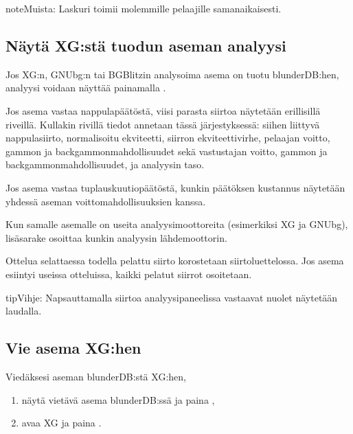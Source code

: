 \documentclass[letterpaper,10pt,finnish]{sphinxmanual}
\begin{document}
\begin{sphinxadmonition}{note}{Muista:}
\sphinxAtStartPar
Laskuri toimii molemmille pelaajille samanaikaisesti.
\end{sphinxadmonition}


\subsection{Näytä XG:stä tuodun aseman analyysi}
\label{\detokenize{guide_utilisateur:afficher-l-analyse-d-une-position-importee-depuis-xg}}
\sphinxAtStartPar
Jos XG:n, GNUbg:n tai BGBlitzin analysoima asema on tuotu blunderDB:hen, analyysi voidaan näyttää painamalla .

\sphinxAtStartPar
Jos asema vastaa nappulapäätöstä, viisi parasta siirtoa näytetään erillisillä riveillä. Kullakin rivillä tiedot annetaan tässä järjestyksessä: siihen liittyvä nappulasiirto, normalisoitu ekviteetti, siirron ekviteettivirhe, pelaajan voitto\sphinxhyphen{}, gammon\sphinxhyphen{} ja backgammon\sphinxhyphen{}mahdollisuudet sekä vastustajan voitto\sphinxhyphen{}, gammon\sphinxhyphen{} ja backgammon\sphinxhyphen{}mahdollisuudet, ja analyysin taso.

\sphinxAtStartPar
Jos asema vastaa tuplauskuutiopäätöstä, kunkin päätöksen kustannus näytetään yhdessä aseman voittomahdollisuuksien kanssa.

\sphinxAtStartPar
Kun samalle asemalle on useita analyysimoottoreita (esimerkiksi XG ja GNUbg), lisäsarake osoittaa kunkin analyysin lähdemoottorin.

\sphinxAtStartPar
Ottelua selattaessa todella pelattu siirto korostetaan siirtoluettelossa. Jos asema esiintyi useissa otteluissa, kaikki pelatut siirrot osoitetaan.

\begin{sphinxadmonition}{tip}{Vihje:}
\sphinxAtStartPar
Napsauttamalla siirtoa analyysipaneelissa vastaavat nuolet näytetään laudalla.
\end{sphinxadmonition}


\subsection{Vie asema XG:hen}
\label{\detokenize{guide_utilisateur:exporter-une-position-vers-xg}}
\sphinxAtStartPar
Viedäksesi aseman blunderDB:stä XG:hen,
\begin{enumerate}
%
\item {} 
\sphinxAtStartPar
näytä vietävä asema blunderDB:ssä ja paina ,

\item {} 
\sphinxAtStartPar
avaa XG ja paina .

\end{enumerate}
\end{document}
